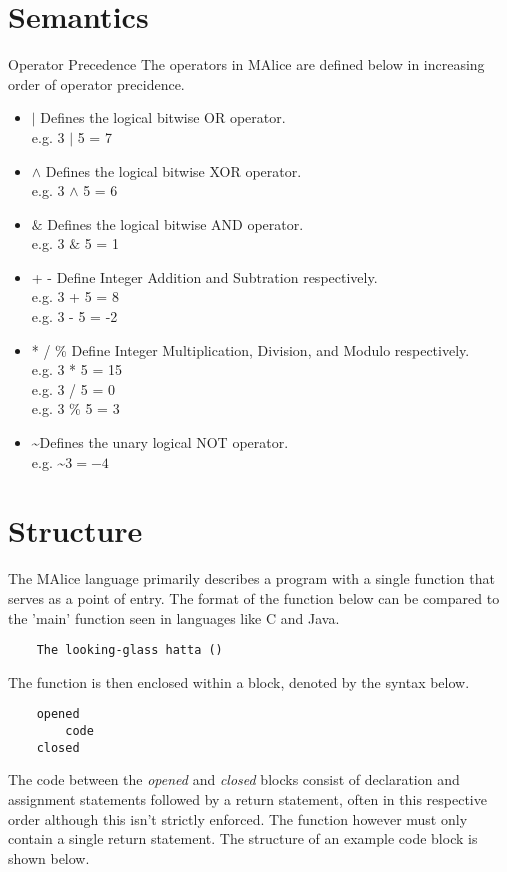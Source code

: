 \documentclass[a4wide, 11pt]{article}
\newcommand{\tab}{\hspace*{2em}}
\begin{document}
\section{Semantics}
Operator Precedence
The operators in MAlice are defined below in increasing order of operator precidence.

\begin{itemize}
	\item
	$|$ Defines the logical bitwise OR operator. 
	\\ \tab e.g. 3 $|$ 5 = 7
	\item
	$\land$ Defines the logical bitwise XOR operator. 
	\\ \tab e.g. 3 $\land$ 5 = 6
	\item
	$\&$ Defines the logical bitwise AND operator. 
	\\ \tab e.g. 3 $\&$ 5 = 1
	\item
	+ - Define Integer Addition and Subtration respectively. 
	\\ \tab e.g. 3 + 5 = 8 \\ \tab e.g. 3 - 5 = -2
	\item
	* / \% Define Integer Multiplication, Division, and Modulo respectively. 
	\\ \tab e.g. 3 * 5 = 15 \\ \tab e.g. 3 / 5 = 0 \\ \tab e.g. 3 \% 5 = 3
	\item
	\textasciitilde  Defines the unary logical NOT operator.
	\\ \tab e.g. \textasciitilde$ 3 = -4$
\end{itemize}

\section{Structure}
The MAlice language primarily describes a program with a single function 
that serves as a point of entry. The format of the function below can be
compared to the 'main' function seen in languages like C and Java.

\begin{verbatim}
    The looking-glass hatta ()
\end{verbatim}

The function is then enclosed within a block, denoted by the syntax below.
\begin{verbatim}
    opened
        code
    closed
\end{verbatim}

The code between the \emph{opened} and \emph{closed} blocks consist of 
declaration and assignment statements followed by a return statement, 
often in this respective order although this isn't strictly enforced. The
function however must only contain a single return statement. The structure
of an example code block is shown below.
\end{document}

